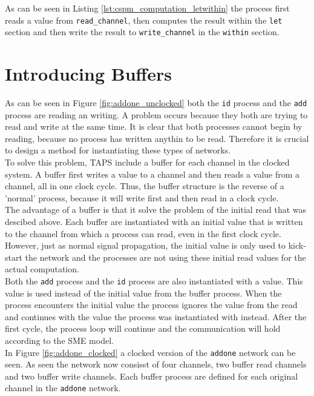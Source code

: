 As can be seen in Listing \ref{lst:cspm_computation_letwithin} the process first reads a value from \texttt{read\_channel}, then computes the result within the \texttt{let} section and then write the result to \texttt{write\_channel} in the \texttt{within} section.
\section{Introducing Buffers}
As can be seen in Figure \ref{fig:addone_unclocked} both the \texttt{id} process and the \texttt{add} process are reading an writing. A problem occurs because they both are trying to read and write at the same time. It is clear that both processes cannot begin by reading, because no process has written anythin to be read. Therefore it is crucial to design a method for instantiating these types of networks.\\

To solve this problem, TAPS include a buffer for each channel in the clocked system. A buffer first writes a value to a channel and then reads a value from a channel, all in one clock cycle. Thus, the buffer structure is the reverse of a 'normal' process, because it will write first and then read in a clock cycle. \\

The advantage of a buffer is that it solve the problem of the initial read that was descibed above. Each buffer are instantiated with an initial value that is written to the channel from which a process can read, even in the first clock cycle. However, just as normal signal propagation, the initial value is only used to kick-start the network and the processes are not using these initial read values for the actual computation. \\

Both the \texttt{add} process and the \texttt{id} process are also instantiated with a value. This value is used instead of the initial value from the buffer process. When the process encounters the initial value the process ignores the value from the read and continues with the value the process was instantiated with instead. After the first cycle, the process loop will continue and the communication will hold according to the SME model.\\

In Figure \ref{fig:addone_clocked} a clocked version of the \texttt{addone} network can be seen. As seen the network now consisst of four channels, two buffer read channels and two buffer write channels. Each buffer process are defined for each original channel in the \texttt{addone} network. \\

